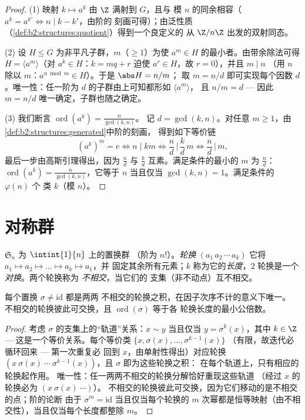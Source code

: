 \begin{proof}
(1) 映射 $k \mapsto a^k$ 由 $\Z$ 满射到 $G$，且与
模 $n$ 的同余相容（$a^{k} = a^{k'} \iff n \mid k - k'$，由阶的
刻画可得）；由泛性质
（\cref{def:b2:structures:quotient}）得到一个良定义的
从 $\Z/n\Z$ 出发的双射同态。

(2) 设 $H \leq G$ 为非平凡子群，$m$（$\geq 1$）为使 $a^m \in
H$ 的最小者。由带余除法可得 $H = \langle a^m\rangle$（对 $a^k \in
H$：$k = mq + r$ 迫使 $a^r \in H$，故 $r = 0$），并且 $m \mid n$
（用 $n$ 除以 $m$：$a^{n \bmod m} \in H$）。于是 $\abs H = n/m$；
取 $m = n/d$ 即可实现每个因数 $d$。唯一性：任一阶为
$d$ 的子群由上可知都形如 $\langle a^m \rangle$，
且 $n/m = d$ ---
因此 $m = n/d$ 唯一确定，子群也随之确定。

(3) 我们断言 $\operatorname{ord}(a^k) = \frac{n}{\gcd(k, n)}$。
记 $d = \gcd(k, n)$。对任意 $m \geq 1$，由
\cref{def:b2:structures:generated}中阶的刻画，
得到如下等价链
\[
(a^k)^m = e
\iff n \mid km
\iff \frac{n}{d} \,\Big|\, \frac{k}{d}\,m
\iff \frac{n}{d} \,\Big|\, m ,
\]
最后一步由高斯引理得出，因为 $\frac nd$ 与 $\frac kd$
互素。满足条件的最小的 $m$ 为 $\frac nd$：
$\operatorname{ord}(a^k) = \frac n{\gcd(k,n)}$，它等于 $n$
当且仅当 $\gcd(k, n) = 1$。满足条件的 $\varphi(n)$ 个
类 $k$（模 $n$）。
\end{proof}

\section{对称群}

\begin{definition}\label{def:b2:structures:sn}
$\mathfrak{S}_n$ 为 $\intint{1}{n}$ 上的置换群
（阶为 $n!$）。\emph{轮换} $(a_1\,a_2\,\cdots\,a_k)$
它将 $a_1 \mapsto a_2 \mapsto \dots \mapsto a_k \mapsto a_1$，并
固定其余所有元素；$k$ 称为它的\emph{长度}，$2$ 轮换是一个
\emph{对换}。两个轮换称为
\emph{不相交}，当它们的
支集（非不动点）互不相交。
\end{definition}

\begin{theorem}[轮换分解]\label{thm:b2:structures:cycles}
每个置换 $\sigma \neq \mathrm{id}$ 都是两两
不相交的轮换之积，在因子次序不计的意义下唯一。
不相交的轮换彼此可交换，且 $\operatorname{ord}(\sigma)$ 等于各
轮换长度的最小公倍数。
\end{theorem}

\begin{proof}
考虑 $\sigma$ 的支集上的“轨道”关系：$x \sim y$
当且仅当 $y = \sigma^k(x)$，其中 $k \in \Z$ ---
这是一个等价关系。每个等价类 $\{x, \sigma(x), \dots, \sigma^{k-1}(x)\}$
（有限，故迭代必循环回来 --- 第一次重复必
回到 $x$，由单射性得出）对应轮换 $(x\ \sigma(x)\
\cdots\ \sigma^{k-1}(x))$，且 $\sigma$ 即为这些轮换之积：
在每个轨道上，只有相应的轮换起作用。
唯一性：任一两两不相交的轮换分解恰好重现这些轨道
（经过 $x$ 的轮换必为 $(x\ \sigma(x)\ \cdots)$）。
不相交的轮换彼此可交换，因为它们移动的是不相交的点；阶的论断
由于 $\sigma^m = \mathrm{id}$ 当且仅当每个轮换的
$m$ 次幂都是恒等映射（由不相交性），当且仅当每个长度都整除 $m$。
\end{proof}

